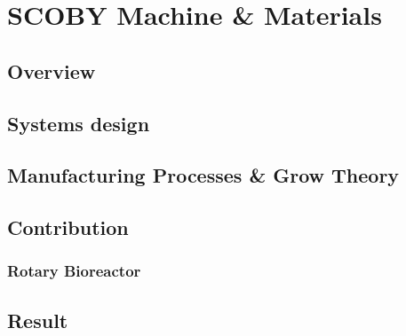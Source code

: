 \chapter{SCOBY Machine \& Materials}


\section{Overview}


\section{Systems design}
\section{Manufacturing Processes \& Grow Theory}

\section{Contribution}

\subsection{Rotary Bioreactor}


\section{Result}

